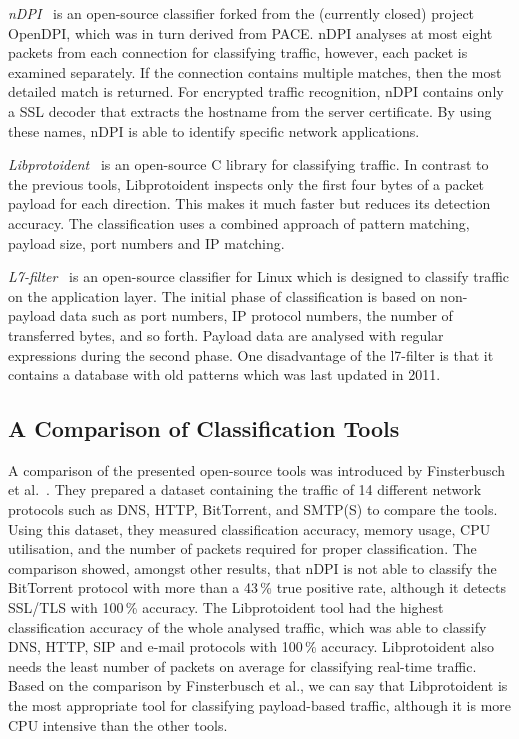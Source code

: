 \textit{nDPI}~\cite{Deri-2014-nDPI} is an open-source classifier forked from the (currently closed) project OpenDPI, which was in turn derived from PACE. nDPI analyses at most eight packets from each connection for classifying traffic, however, each packet is examined separately. If the connection contains multiple matches, then the most detailed match is returned. For encrypted traffic recognition, nDPI contains only a SSL decoder that extracts the hostname from the server certificate. By using these names, nDPI is able to identify specific network applications.

\textit{Libprotoident}~\cite{Alcock-2012-libprotoident} is an open-source C library for classifying traffic. In contrast to the previous tools, Libprotoident inspects only the first four bytes of a packet payload for each direction. This makes it much faster but reduces its detection accuracy. The classification uses a combined approach of pattern matching, payload size, port numbers and IP matching.

\textit{L7-filter}~\cite{l7-filter} is an open-source classifier for Linux which is designed to classify traffic on the application layer. The initial phase of classification is based on non-payload data such as port numbers, IP protocol numbers, the number of transferred bytes, and so forth. Payload data are analysed with regular expressions during the second phase. One disadvantage of the l7-filter is that it contains a database with old patterns which was last updated in 2011.


\subsection{A Comparison of Classification Tools}
A comparison of the presented open-source tools was introduced by Finsterbusch et al.~\cite{Finsterbusch-2014-Survey}. They prepared a dataset containing the traffic of 14 different network protocols such as DNS, HTTP, BitTorrent, and SMTP(S) to compare the tools. Using this dataset, they measured classification accuracy, memory usage, CPU utilisation, and the number of packets required for proper classification. The comparison showed, amongst other results, that nDPI is not able to classify the BitTorrent protocol with more than a 43\,\% true positive rate, although it detects SSL/TLS with 100\,\% accuracy. The Libprotoident tool had the highest classification accuracy of the whole analysed traffic, which was able to classify DNS, HTTP, SIP and e-mail protocols with 100\,\% accuracy. Libprotoident also needs the least number of packets on average for classifying real-time traffic. Based on the comparison by Finsterbusch et al., we can say that Libprotoident is the most appropriate tool for classifying payload-based traffic, although it is more CPU intensive than the other tools.

